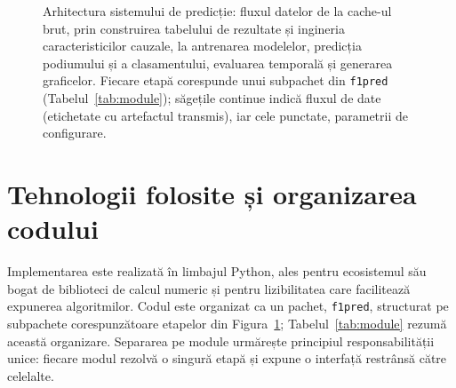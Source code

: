 \documentclass[12pt,a4paper]{report}
\begin{document}
\begin{figure}[htbp]
  \caption{Arhitectura sistemului de predicție: fluxul datelor de la cache-ul brut,
    prin construirea tabelului de rezultate și ingineria caracteristicilor cauzale, la
    antrenarea modelelor, predicția podiumului și a clasamentului, evaluarea temporală și
    generarea graficelor. Fiecare etapă corespunde unui subpachet din \texttt{f1pred}
    (Tabelul~\ref{tab:module}); săgețile continue indică fluxul de date (etichetate cu
    artefactul transmis), iar cele punctate, parametrii de configurare.}
  \label{fig:arhitectura}
\end{figure}

\section{Tehnologii folosite și organizarea codului}
\label{sec:tehnologii}

Implementarea este realizată în limbajul Python, ales pentru ecosistemul său bogat de biblioteci
de calcul numeric și pentru lizibilitatea care facilitează expunerea algoritmilor. Codul este
organizat ca un pachet, \texttt{f1pred}, structurat pe subpachete corespunzătoare etapelor din
Figura~\ref{fig:arhitectura}; Tabelul~\ref{tab:module} rezumă această organizare. Separarea pe
module urmărește principiul responsabilității unice: fiecare modul rezolvă o singură etapă și
expune o interfață restrânsă către celelalte.
\end{document}
